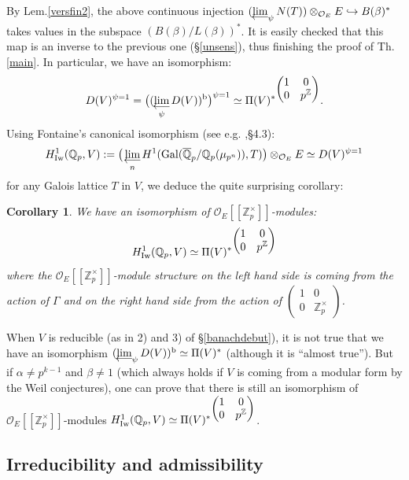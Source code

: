 \documentclass[11pt]{amsart}
\def\limproj{\mathop{\oalign{{\rm lim}\cr 
\hidewidth$\longleftarrow$\hidewidth\cr}}}
\def\Z{{\mathbb Z}_p}
\def\Q{{\mathbb Q}_p}
\def\O{{\mathcal O}_E}
\newtheorem{cor}[definit]{\bf{Corollary}}
\begin{document}
By Lem.\ref{versfin2}, the above continuous injection
$(\limproj_{\psi}N(T))\otimes_{\O}E\hookrightarrow B(\beta)^*$ takes
values in the subspace $(B(\beta)/L(\beta))^*$. It is easily checked
that this map is an inverse to the previous one (\S\ref{unsens}), thus
finishing the proof of Th.\ref{main}. In particular, we have an
isomorphism:  
$$D(V)^{\psi=1}=\big((\limproj_{\psi}D(V))^{\rm b}\big)^{\psi=1}\simeq
{\Pi(V)^*}^{\begin{pmatrix}1&0\\0&p^{\mathbb Z}\end{pmatrix}}.$$  
Using Fontaine's canonical isomorphism (see e.g. \cite{Co2},\S4.3): 
\begin{eqnarray}\label{fontaine} 
H^1_{\rm Iw}(\Q,V):=\big(\limproj_n H^1({\rm
  Gal}(\overline\Q/\Q(\mu_{p^n})),
T)\big)\otimes_{\O}E\simeq D(V)^{\psi=1} 
\end{eqnarray} 
for any Galois lattice $T$ in $V$, we deduce the quite surprising corollary: 
 
\begin{cor}\label{brfoiw}
We have an isomorphism of $\O[[\Z^{\times}]]$-modules: 
$$H^1_{\rm Iw}(\Q,V)\simeq {\Pi(V)^*}^{\begin{pmatrix}
1&0\\0&p^{\mathbb Z}\end{pmatrix}}$$ 
where the $\O[[\Z^{\times}]]$-module structure on the left hand side
is coming from the action of $\Gamma$ and on the right hand side from
the action of $\begin{pmatrix}1&0\\0&\Z^{\times}\end{pmatrix}$.  
\end{cor} 
 
When $V$ is reducible (as in 2) and 3) of \S\ref{banachdebut}), it is
not true that we have an isomorphism $(\limproj_{\psi}D(V))^{\rm
  b}\simeq \Pi(V)^*$ (although it is ``almost true''). But if
$\alpha\ne p^{k-1}$ and $\beta\ne 1$ (which always holds if $V$ is
coming from a modular form by the Weil conjectures), one can prove
that there is still an isomorphism of $\O[[\Z^{\times}]]$-modules
$H^1_{\rm Iw}(\Q,V)\simeq {\Pi(V)^*}^{\begin{pmatrix}1&0\\0&p^{\mathbb
      Z}\end{pmatrix}}$.  
 
 
\subsection{Irreducibility and admissibility}\label{results} 
 
\end{document}
